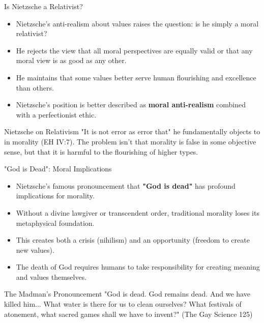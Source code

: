 \documentclass{beamer}
\begin{document}
\begin{frame}{Is Nietzsche a Relativist?}
\begin{itemize}
\item Nietzsche's anti-realism about values raises the question: is he simply a moral relativist?
\item He rejects the view that all moral perspectives are equally valid or that any moral view is as good as any other.
\item He maintains that some values better serve human flourishing and excellence than others.
\item Nietzsche's position is better described as \textbf{moral anti-realism} combined with a perfectionist ethic.
\end{itemize}

\begin{exampleblock}{Nietzsche on Relativism}
"It is not error as error that" he fundamentally objects to in morality (EH IV:7). The problem isn't that morality is false in some objective sense, but that it is harmful to the flourishing of higher types.
\end{exampleblock}
\end{frame}

\begin{frame}{"God is Dead": Moral Implications}
\begin{itemize}
\item Nietzsche's famous pronouncement that \textbf{"God is dead"} has profound implications for morality.
\item Without a divine lawgiver or transcendent order, traditional morality loses its metaphysical foundation.
\item This creates both a crisis (nihilism) and an opportunity (freedom to create new values).
\item The death of God requires humans to take responsibility for creating meaning and values themselves.
\end{itemize}

\begin{alertblock}{The Madman's Pronouncement}
"God is dead. God remains dead. And we have killed him... What water is there for us to clean ourselves? What festivals of atonement, what sacred games shall we have to invent?" (The Gay Science 125)
\end{alertblock}
\end{frame}
\end{document}
